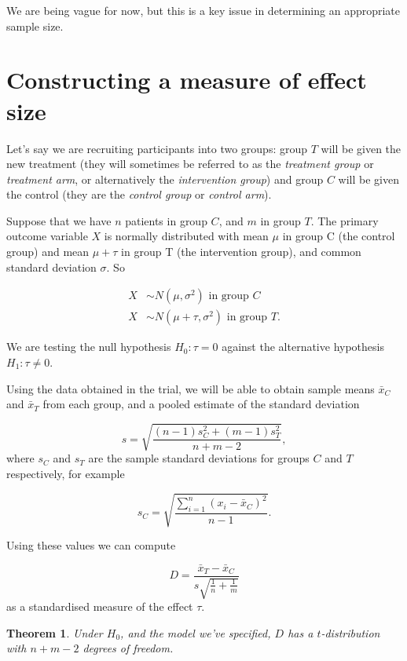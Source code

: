 \documentclass[
  openany]{book}
\newtheorem{theorem}{Theorem}[chapter]
\theoremstyle{definition}
\theoremstyle{definition}
\theoremstyle{definition}
\theoremstyle{definition}
\theoremstyle{remark}
\begin{document}
We are being vague for now, but this is a key issue in determining an appropriate sample size.

\section{Constructing a measure of effect size}\label{sec-measDcont}

Let's say we are recruiting participants into two groups: group \(T\) will be given the new treatment (they will sometimes be referred to as the \emph{treatment group} or \emph{treatment arm}, or alternatively the \emph{intervention group}) and group \(C\) will be given the control (they are the \emph{control group} or \emph{control arm}).

Suppose that we have \(n\) patients in group \(C\), and \(m\) in group \(T\). The primary outcome variable \(X\) is normally distributed with mean \(\mu\) in group C (the control group) and mean \(\mu+\tau\) in group T (the intervention group), and common standard deviation \(\sigma\). So

\begin{align*}
X & \sim N\left(\mu, \sigma^2\right) \text{ in group }C\\
X & \sim N\left(\mu + \tau, \sigma^2\right) \text{ in group }T.
\end{align*}

We are testing the null hypothesis \(H_0: \tau=0\) against the alternative hypothesis \(H_1: \tau\neq{0}\).

Using the data obtained in the trial, we will be able to obtain sample means \(\bar{x}_C\) and \(\bar{x}_T\) from each group, and a pooled estimate of the standard deviation

\[ s = \sqrt{\frac{\left(n-1\right)s_C^2 + (m-1)s_T^2}{n+m - 2}},
\]
where \(s_C\) and \(s_T\) are the sample standard deviations for groups \(C\) and \(T\) respectively, for example

\[
s_C = \sqrt{\frac{\sum\limits_{i=1}^n{\left(x_i - \bar{x}_C\right)^2}}{n-1}}.
\]

Using these values we can compute

\[D = \frac{\bar{x}_T - \bar{x}_C}{s\sqrt{\frac{1}{n} + \frac{1}{m}}}\]
as a standardised measure of the effect \(\tau\).

\begin{theorem}
Under \(H_0\), and the model we've specified, \(D\) has a \(t\)-distribution with \(n+m-2\) degrees of freedom.
\end{theorem}
\end{document}
